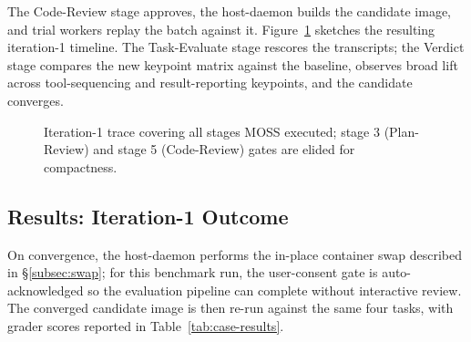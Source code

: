 The Code-Review stage approves, the host-daemon builds the candidate image, and trial workers replay the batch against it. Figure~\ref{fig:iter1-timeline} sketches the resulting iteration-1 timeline. The Task-Evaluate stage rescores the transcripts; the Verdict stage compares the new keypoint matrix against the baseline, observes broad lift across tool-sequencing and result-reporting keypoints, and the candidate converges.

\begin{figure}[ht]
\centering
{}
\caption{Iteration-1 trace covering all stages MOSS executed; stage 3 (Plan-Review) and stage 5 (Code-Review) gates are elided for compactness.}
\label{fig:iter1-timeline}
\end{figure}

\subsection{Results: Iteration-1 Outcome}
\label{subsec:case-results}

On convergence, the host-daemon performs the in-place container swap described in \S\ref{subsec:swap}; for this benchmark run, the user-consent gate is auto-acknowledged so the evaluation pipeline can complete without interactive review. The converged candidate image is then re-run against the same four tasks, with grader scores reported in Table~\ref{tab:case-results}.

